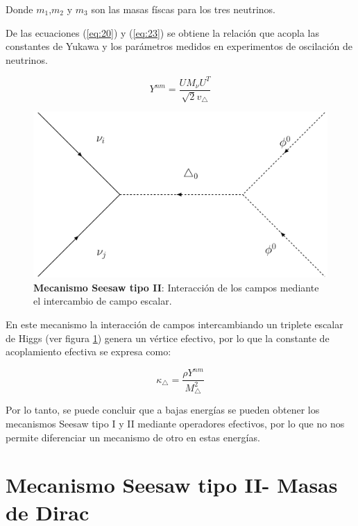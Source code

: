 \documentclass[12pt]{article}
\begin{document}
Donde \( m_1 \),\( m_2 \) y \( m_3 \) son las masas físcas para los tres neutrinos. 


De las ecuaciones (\ref{eq:20}) y (\ref{eq:23})  se obtiene la relación que acopla las constantes de Yukawa y los parámetros medidos en experimentos de oscilación de neutrinos. 

\begin{equation}
Y^{nm}=\frac{UM_{\nu}U^{T}}{\sqrt{2}v_\triangle}
    \label{eq:26}
\end{equation}


\begin{figure}[h!]
  \begin{center}
  \includegraphics[scale=0.4]{Mecanismo See-saw tipo IIMajorana.pdf}
\caption{{\textbf{Mecanismo Seesaw tipo II}: Interacción de los campos mediante el intercambio de campo escalar.}}
\label{fig:Majorana2}
\end{center}
\end{figure}

En este mecanismo la interacción de campos intercambiando un triplete escalar de Higgs (ver figura \ref{fig:Majorana2}) genera un vértice efectivo, por lo que la constante de acoplamiento
efectiva se expresa como: 

\begin{equation}
    \kappa_\triangle=\frac{\rho Y^{nm}}{M^{2}_\triangle }
\end{equation}

Por lo tanto, se puede concluir que a bajas energías se pueden obtener los mecanismos Seesaw tipo I y II mediante operadores efectivos, por lo que no nos permite diferenciar un mecanismo de otro en estas energías.


\section{Mecanismo Seesaw tipo II- Masas de Dirac}
\end{document}
